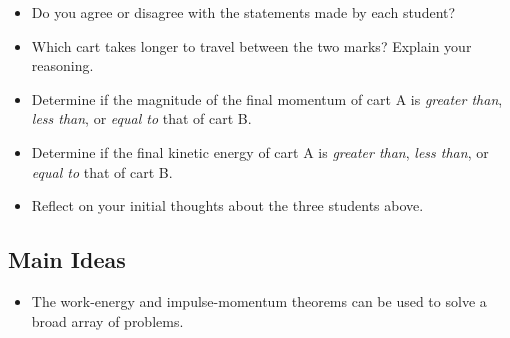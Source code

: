\documentclass[]{article}
\begin{document}
\begin{PresentSpace}
\begin{itemize}
	\item Do you agree or disagree with the statements made by each student?
	\item Which cart takes longer to travel between the two marks? Explain your reasoning.
	\item Determine if the magnitude of the final momentum of cart A is \textit{greater than}, \textit{less than}, or \textit{equal to} that of cart B.
	\item Determine if the final kinetic energy of cart A is \textit{greater than}, \textit{less than}, or \textit{equal to} that of cart B.
	\item Reflect on your initial thoughts about the three students above.
\end{itemize}
\begin{center}
	\large
\end{center}
\end{PresentSpace}
\newpage
\begin{TeacherMargin}

\end{TeacherMargin}
\begin{PresentSpace}
\section*{Main Ideas}
\begin{itemize}
	\item The work-energy and impulse-momentum theorems can be used to solve a broad array of problems.
\end{itemize}
\end{PresentSpace}
\end{document}
